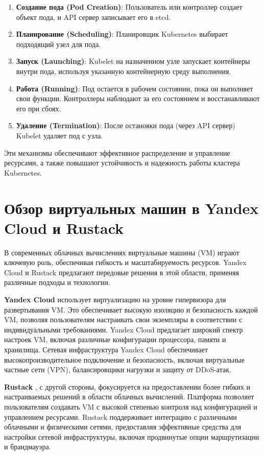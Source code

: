 \begin{enumerate}
   \item \textbf{Создание пода (Pod Creation)}: Пользователь или контроллер
создает объект пода, и API сервер записывает его в etcd.
   \item \textbf{Планирование (Scheduling)}: Планировщик Kubernetes выбирает
подходящий узел для пода.
   \item \textbf{Запуск (Launching)}: Kubelet на назначенном узле запускает
контейнеры внутри пода, используя указанную контейнерную среду выполнения.
   \item \textbf{Работа (Running)}: Под остается в рабочем состоянии, пока он
выполняет свои функции. Контроллеры наблюдают за его состоянием и
восстанавливают его при сбоях.
   \item \textbf{Удаление (Termination)}: После остановки пода (через API
сервер) Kubelet удаляет под с узла.
\end{enumerate}

Эти механизмы обеспечивают эффективное распределение и управление ресурсами, а
также повышают устойчивость и надежность работы кластера Kubernetes.

\section*{Обзор виртуальных машин в Yandex Cloud и Rustack}

В современных облачных вычислениях виртуальные машины (VM) играют ключевую роль,
обеспечивая гибкость и масштабируемость ресурсов. Yandex Cloud и Rustack
предлагают передовые решения в этой области, применяя различные подходы и
технологии.

\textbf{Yandex Cloud} \cite{yandexcloud} использует виртуализацию на уровне
гипервизора для
развертывания VM. Это обеспечивает высокую изоляцию и безопасность каждой VM,
позволяя пользователям настраивать свои экземпляры в соответствии с
индивидуальными требованиями. Yandex Cloud предлагает широкий спектр настроек
VM, включая различные конфигурации процессора, памяти и хранилища. Сетевая
инфраструктура Yandex Cloud обеспечивает высокопроизводительное подключение и
безопасность, включая виртуальные частные сети (VPN), балансировщики нагрузки и
защиту от DDoS-атак.

\textbf{Rustack} \cite{rustack}, с другой стороны, фокусируется на
предоставлении
более гибких
и настраиваемых решений в области облачных вычислений. Платформа позволяет
пользователям создавать VM с высокой степенью контроля над конфигурацией и
управлением ресурсами. Rustack поддерживает интеграцию с различными облачными и
физическими сетями, предоставляя эффективные средства для настройки сетевой
инфраструктуры, включая продвинутые опции маршрутизации и брандмауэра.

